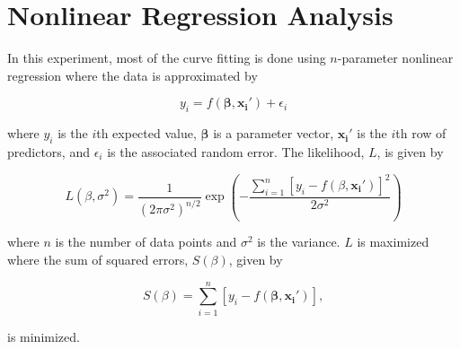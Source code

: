 
\section{Nonlinear Regression Analysis}\label{nonlinearregressionanalysis}
In this experiment, most of the curve fitting is done using $n$-parameter nonlinear regression where the data is approximated by \cite{bates}

\begin{equation}
\label{nonlinfit}
y_{i}=f(\mathbf{\beta},\mathbf{x_{i}'})+\epsilon_{i}
\end{equation}

where $y_{i}$ is the $i$th expected value, $\mathbf{\beta}$ is a parameter vector, $\mathbf{x_{i}'}$ is the $i$th row of predictors, and $\epsilon_{i}$ is the associated random error.  The likelihood, $L$, is given by \cite{bates}

\begin{equation}
\label{likelihood}
L(\beta,\sigma^{2})=\frac{1}{(2\pi\sigma^{2})^{n/2}}\exp(-\frac{\sum_{i=1}^{n}[y_{i}-f(\beta,\mathbf{x_{i}'})]^{2}}{2\sigma^{2}})
\end{equation}

where $n$ is the number of data points and $\sigma^{2}$ is the variance. $L$ is maximized where the sum of squared errors, $S(\beta)$, given by \cite{bates}

\begin{equation}
\label{sse}
S(\beta) = \sum_{i=1}^{n}[y_{i}-f(\mathbf{\beta},\mathbf{x_{i}'})],
\end{equation}

is minimized.